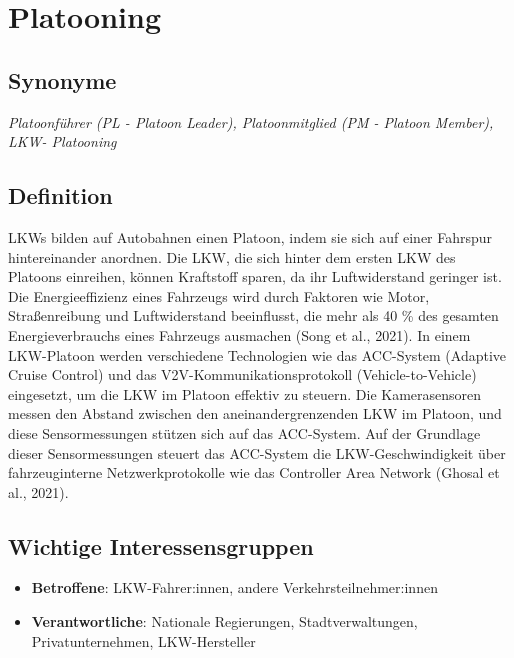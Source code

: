 \documentclass[
]{book}
\providecommand{\tightlist}{%
  \setlength{\itemsep}{0pt}\setlength{\parskip}{0pt}}
\begin{document}
\hypertarget{platooning}{%
\section{Platooning}\label{platooning}}

\hypertarget{synonyme-9}{%
\subsection*{Synonyme}\label{synonyme-9}}

\emph{Platoonführer (PL - Platoon Leader), Platoonmitglied (PM - Platoon Member), LKW- Platooning}

\hypertarget{definition-10}{%
\subsection*{Definition}\label{definition-10}}

LKWs bilden auf Autobahnen einen Platoon, indem sie sich auf einer Fahrspur hintereinander anordnen. Die LKW, die sich hinter dem ersten LKW des Platoons einreihen, können Kraftstoff sparen, da ihr Luftwiderstand geringer ist. Die Energieeffizienz eines Fahrzeugs wird durch Faktoren wie Motor, Straßenreibung und Luftwiderstand beeinflusst, die mehr als 40 \% des gesamten Energieverbrauchs eines Fahrzeugs ausmachen (Song et al., 2021). In einem LKW-Platoon werden verschiedene Technologien wie das ACC-System (Adaptive Cruise Control) und das V2V-Kommunikationsprotokoll (Vehicle-to-Vehicle) eingesetzt, um die LKW im Platoon effektiv zu steuern. Die Kamerasensoren messen den Abstand zwischen den aneinandergrenzenden LKW im Platoon, und diese Sensormessungen stützen sich auf das ACC-System. Auf der Grundlage dieser Sensormessungen steuert das ACC-System die LKW-Geschwindigkeit über fahrzeuginterne Netzwerkprotokolle wie das Controller Area Network (Ghosal et al., 2021).

\hypertarget{wichtige-interessensgruppen-10}{%
\subsection*{Wichtige Interessensgruppen}\label{wichtige-interessensgruppen-10}}

\begin{itemize}
\tightlist
\item
  \textbf{Betroffene}: LKW-Fahrer:innen, andere Verkehrsteilnehmer:innen
\item
  \textbf{Verantwortliche}: Nationale Regierungen, Stadtverwaltungen, Privatunternehmen, LKW-Hersteller
\end{itemize}
\end{document}
